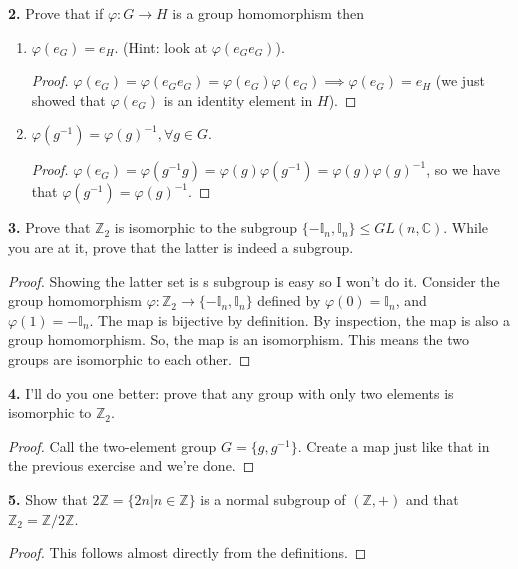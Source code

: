 \documentclass{book}
\theoremstyle{definition}
\begin{document}
\noindent \textbf{2.} Prove that if $\varphi : G \to H$ is a group homomorphism then 
\begin{enumerate}
	\item $\varphi(e_G) = e_H$. (Hint: look at $\varphi(e_G e_G)$).
	
	\begin{proof}
		$\varphi(e_G) = \varphi(e_G e_G) = \varphi(e_G)\varphi(e_G) \implies \varphi(e_G) =e_H$ (we just showed that $\varphi(e_G)$ is an identity element in $H$). 
	\end{proof}
	
	\item $\varphi(g^{-1}) = \varphi(g)^{-1}, \forall g\in G$.
	\begin{proof}
		$\varphi(e_G) = \varphi(g^{-1}g)= \varphi(g)\varphi(g^{-1}) = \varphi(g)\varphi(g)^{-1}$, so we have that $\varphi(g^{-1}) = \varphi(g)^{-1}$.
	\end{proof}
\end{enumerate}


\noindent \textbf{3.} Prove that $\mathbb{Z}_2$ is isomorphic to the subgroup $\{-\mathbb{I}_n, \mathbb{I}_n \} \leq GL(n,\mathbb{C})$. While you are at it, prove that the latter is indeed a subgroup.

\begin{proof}
	Showing the latter set is s subgroup is easy so I won't do it. Consider the group homomorphism $\varphi: \mathbb{Z}_2 \to \{ -\mathbb{I}_n, \mathbb{I}_n \}$ defined by $\varphi(0) = \mathbb{I}_n$, and $\varphi(1) = -\mathbb{I}_n$. The map is bijective by definition. By inspection, the map is also a group homomorphism. So, the map is an isomorphism. This means the two groups are isomorphic to each other. 
\end{proof}


\noindent \textbf{4.} I'll do you one better: prove that any group with only two elements is isomorphic to $\mathbb{Z}_2$.

\begin{proof}
	Call the two-element group $G = \{ g,g^{-1} \}$. Create a map just like that in the previous exercise and we're done. 
\end{proof}





\noindent \textbf{5.} Show that $2\mathbb{Z} = \{ 2n \vert n \in \mathbb{Z} \}$ is a normal subgroup of $(\mathbb{Z},+)$ and that $\mathbb{Z}_2 = \mathbb{Z} / 2\mathbb{Z}$.


\begin{proof}
	This follows almost directly from the definitions. 
\end{proof}
\end{document}
